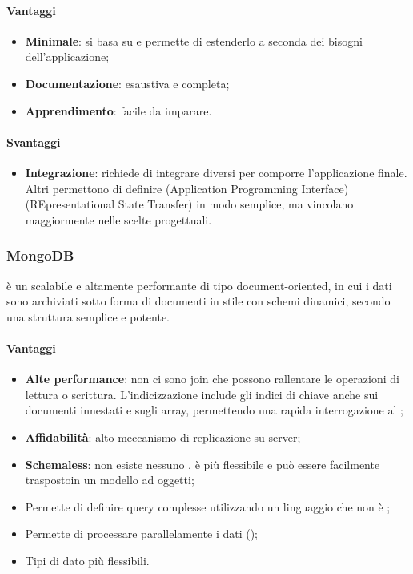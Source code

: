 \paragraph{Vantaggi}
\begin{itemize}
\item \textbf{Minimale}: si basa su  e permette di estenderlo a seconda dei bisogni
dell’applicazione;
\item\textbf{Documentazione}: esaustiva e completa;
\item\textbf{Apprendimento}: facile da imparare.
\end{itemize}

\paragraph{Svantaggi}
\begin{itemize}
\item \textbf{Integrazione}: richiede di integrare  diversi per comporre l’applicazione
finale. Altri  permettono di definire  (Application Programming
Interface)  (REpresentational State Transfer) in modo semplice, ma vincolano
maggiormente nelle scelte progettuali.
\end{itemize}

	
	\subsubsection{MongoDB}
\textbf{} è un    scalabile e altamente performante di tipo document-oriented, in cui i dati sono archiviati sotto forma di documenti in stile  con schemi dinamici, secondo una struttura semplice e potente. \\

\paragraph{Vantaggi}
 \begin{itemize}

\item \textbf{Alte performance}: non ci sono join che possono rallentare le operazioni di lettura o scrittura. L'indicizzazione include gli indici di chiave anche sui documenti innestati e sugli array, permettendo una rapida interrogazione al ;
\item \textbf{Affidabilità}: alto meccanismo di replicazione su server;
\item \textbf{Schemaless}: non esiste nessuno  , è più flessibile e può essere facilmente traspostoin un modello ad oggetti;
\item Permette di definire query complesse utilizzando un linguaggio che non è ;
\item Permette di processare parallelamente i dati ();
\item Tipi di dato più flessibili.
\end{itemize}  

